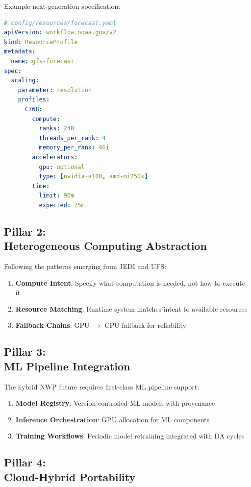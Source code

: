 \documentclass[11pt,twocolumn]{article}
\begin{document}
Example next-generation specification:

\begin{lstlisting}[language=YAML, caption={Proposed Declarative Resource Format}]
# config/resources/forecast.yaml
apiVersion: workflow.noaa.gov/v2
kind: ResourceProfile
metadata:
  name: gfs-forecast
spec:
  scaling:
    parameter: resolution
    profiles:
      C768:
        compute:
          ranks: 240
          threads_per_rank: 4
          memory_per_rank: 4Gi
        accelerators:
          gpu: optional
          type: [nvidia-a100, amd-mi250x]
        time:
          limit: 90m
          expected: 75m
\end{lstlisting}

\subsection{Pillar 2:\\ Heterogeneous Computing Abstraction}

Following the patterns emerging from JEDI and UFS:

\begin{enumerate}
    \item \textbf{Compute Intent}: Specify what computation is needed, not how to execute it
    \item \textbf{Resource Matching}: Runtime system matches intent to available resources
    \item \textbf{Fallback Chains}: GPU $\rightarrow$ CPU fallback for reliability
\end{enumerate}

\subsection{Pillar 3:\\ ML Pipeline Integration}

The hybrid NWP future requires first-class ML pipeline support:

\begin{enumerate}
    \item \textbf{Model Registry}: Version-controlled ML models with provenance
    \item \textbf{Inference Orchestration}: GPU allocation for ML components
    \item \textbf{Training Workflows}: Periodic model retraining integrated with DA cycles
\end{enumerate}

\subsection{Pillar 4:\\ Cloud-Hybrid Portability}
\end{document}
